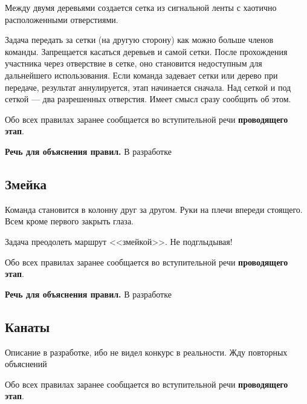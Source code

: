 \documentclass[a4paper, 14pt]{extarticle}
\theoremstyle{definition}
\begin{document}
\par Между двумя деревьями создается сетка из сигнальной ленты с хаотично расположенными отверстиями.

\par Задача передать за сетки (на другую сторону) как можно больше членов команды. Запрещается касаться деревьев и самой сетки. После прохождения участника через отверствие в сетке, оно становится недоступным для дальнейшего использования. Если команда задевает сетки или дерево при передаче, результат аннулируется, этап начинается сначала. Над сеткой и под сеткой --- два разрешенных отверстия. Имеет смысл сразу сообщить об этом.

\par Обо всех правилах заранее сообщается во вступительной речи \textbf{проводящего этап}.

\par \textbf{Речь для объяснения правил.} В разработке

{}
\subsection*{Змейка}

\par Команда становится в колонну друг за другом. Руки на плечи впереди стоящего. Всем кроме первого закрыть глаза.

\par Задача преодолеть маршрут <<змейкой>>. Не подглыдывая!

\par Обо всех правилах заранее сообщается во вступительной речи \textbf{проводящего этап}.

\par \textbf{Речь для объяснения правил.} В разработке


{}
\subsection*{Канаты}

\par Описание в разработке, ибо не видел конкурс в реальности. Жду повторных объяснений

\par 

\par Обо всех правилах заранее сообщается во вступительной речи \textbf{проводящего этап}.
\end{document}
